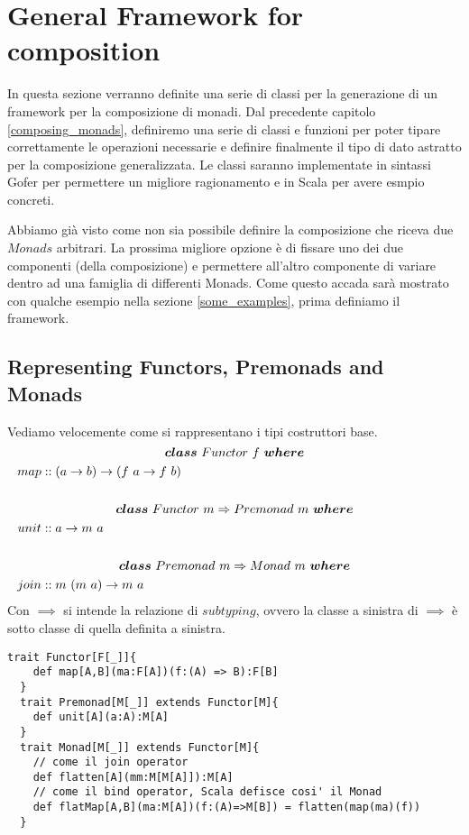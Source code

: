 \pagebreak
\section{General Framework for composition}
\label{general_framework_for_composition}

In questa sezione verranno definite una serie di classi per la generazione di
un framework per la composizione di monadi.
Dal precedente capitolo \ref{composing_monads}, definiremo una serie di classi e
funzioni per poter tipare correttamente le operazioni necessarie e definire
finalmente il tipo di dato astratto per la composizione generalizzata.
Le classi saranno implementate in sintassi Gofer per permettere un migliore
ragionamento e in Scala per avere esmpio concreti.\newline

Abbiamo già visto come non sia possibile definire la composizione che riceva
due $Monads$ arbitrari.
La prossima migliore opzione è di fissare uno dei due componenti (della
composizione) e permettere all'altro componente di variare dentro ad una
famiglia di differenti Monads.
Come questo accada sarà mostrato con qualche esempio nella sezione
\ref{some_examples}, prima definiamo il framework.\newline

\subsection{Representing Functors, Premonads and Monads}
Vediamo velocemente come si rappresentano i tipi costruttori base.
\begin{align*}
  \classdef{\bm{class}\ Functor\ f\ \bm{where}}
  map &:: (a \to b) \to (f\ a \to f\ b)\\\\
  \classdef{\bm{class}\ Functor\ m \Rightarrow Premonad\ m\ \bm{where}}
  unit &:: a \to m\ a\\\\
  \classdef{\bm{class}\ Premonad\ m \Rightarrow Monad\ m\ \bm{where}}
  join &:: m\ (m\ a) \to m\ a
\end{align*}
Con $\implies$ si intende la relazione di $subtyping$, ovvero la classe a sinistra
di $\implies$ è sotto classe di quella definita a sinistra.

\begin{lstlisting}[style=myScalastyle, caption=Functor Premonad and Monad Traits]
  trait Functor[F[_]]{
    def map[A,B](ma:F[A])(f:(A) => B):F[B]
  }
  trait Premonad[M[_]] extends Functor[M]{
    def unit[A](a:A):M[A]
  }
  trait Monad[M[_]] extends Functor[M]{
    // come il join operator
    def flatten[A](mm:M[M[A]]):M[A]
    // come il bind operator, Scala defisce cosi' il Monad
    def flatMap[A,B](ma:M[A])(f:(A)=>M[B]) = flatten(map(ma)(f))
  }
\end{lstlisting}

